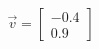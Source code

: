 \documentclass[preview]{standalone}
\begin{document}
\begin{align*}
\vec{v}=\begin{bmatrix}-0.4\\0.9\end{bmatrix}
\end{align*}
\end{document}
